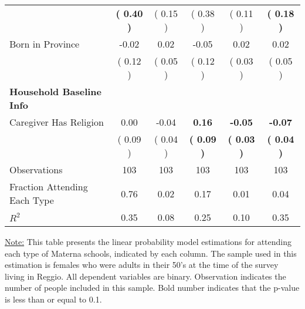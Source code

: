 \begin{table}[H]
{\begin{tabular}{lccccc}
\quad  & \textbf{(     0.40 )} & (     0.15 )  & (     0.38 )  & (     0.11 ) & \textbf{(     0.18 )} \\
\quad Born in Province &     -0.02 &      0.02 &     -0.05 &      0.02 &      0.02 \\
\quad  & (     0.12 ) & (     0.05 )  & (     0.12 )  & (     0.03 ) & (     0.05 ) \\
\midrule
\textbf{Household Baseline Info} \\
\quad Caregiver Has Religion &      0.00 &     -0.04 & \textbf{     0.16} & \textbf{    -0.05} & \textbf{    -0.07} \\
\quad  & (     0.09 ) & (     0.04 )  & \textbf{(     0.09 )}  & \textbf{(     0.03 )} & \textbf{(     0.04 )} \\
\midrule
Observations & 103 & 103 & 103 & 103 & 103 \\
Fraction Attending Each Type &      0.76 &      0.02 &      0.17 &      0.01 &      0.04 \\
\midrule
$ R^2$ &      0.35 &      0.08 &      0.25 &      0.10 &      0.35 \\
\bottomrule
\end{tabular}}
\end{table}
\begin{footnotesize}
\noindent\underline{Note:} This table presents the linear probability model estimations for attending each type of Materna schools, indicated by each column. The sample used in this estimation is females who were adults in their 50's at the time of the survey living in Reggio. All dependent variables are binary. Observation indicates the number of people included in this sample. Bold number indicates that the p-value is less than or equal to 0.1.
\end{footnotesize}
